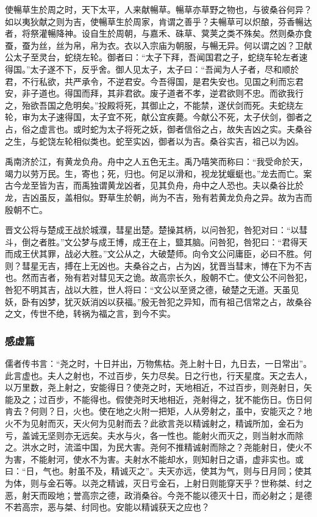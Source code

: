 \documentclass[]{article}
\begin{document}
使暢草生於周之时，天下太平，人来献暢草。暢草亦草野之物也，与彼桑谷何异？如以夷狄献之则为吉，使暢草生於周家，肯谓之善乎？夫暢草可以炽酿，芬香暢达者，将祭灌暢降神。设自生於周朝，与嘉禾、硃草、蓂荚之类不殊矣。然则桑亦食蚕，蚕为丝，丝为帛，帛为衣。衣以入宗庙为朝服，与暢无异。何以谓之凶？卫献公太子至灵台，蛇绕左轮。御者曰：``太子下拜，吾闻国君之子，蛇绕车轮左者速得国。''太子遂不下，反乎舍。御人见太子，太子曰：``吾闻为人子者，尽和顺於君，不行私欲，共严承令，不逆君安。今吾得国，是君失安也。见国之利而忘君安，非子道也。得国而拜，其非君欲。废子道者不孝，逆君欲则不忠。而欲我行之，殆欲吾国之危明矣。''投殿将死，其御止之，不能禁，遂伏剑而死。夫蛇绕左轮，审为太子速得国，太子宜不死，献公宜疾薨。今献公不死，太子伏剑，御者之占，俗之虚言也。或时蛇为太子将死之妖，御者信俗之占，故失吉凶之实。夫桑谷之生，与蛇饶左轮相似类也。蛇至实凶，御者以为吉。桑谷实吉，祖己以为凶。

禹南济於江，有黄龙负舟。舟中之人五色无主。禹乃嘻笑而称曰：``我受命於天，竭力以劳万民。生，寄也；死，归也。何足以滑和，视龙犹蝘蜓也。''龙去而亡。案古今龙至皆为吉，而禹独谓黄龙凶者，见其负舟，舟中之人恐也。夫以桑谷比於龙，吉凶虽反，盖相似。野草生於朝，尚为不吉，殆有若黄龙负舟之异。故为吉而殷朝不亡。

晋文公将与楚成王战於城濮，彗星出楚。楚操其柄，以问咎犯，咎犯对曰：``以彗斗，倒之者胜。''文公梦与成王博，成王在上，盬其脑。问咎犯，咎犯曰：``君得天而成王伏其罪，战必大胜。''文公从之，大破楚师。向令文公问庸臣，必曰不胜。何则？彗星无吉，搏在上无凶也。夫桑谷之占，占为凶，犹晋当彗末，博在下为不吉也。然而吉者，殆有若对彗见天之诡。故高宗长久，殷朝不亡。使文公不问咎犯，咎犯不明其吉，战以大胜，世人将曰：``文公以至贤之德，破楚之无道。天虽见妖，卧有凶梦，犹灭妖消凶以获福。''殷无咎犯之异知，而有祖己信常之占，故桑谷之文，传世不绝，转祸为福之言，到今不实。

\hypertarget{header-n190}{%
\subsubsection{感虚篇}\label{header-n190}}

儒者传书言：``尧之时，十日并出，万物焦枯。尧上射十日，九日去，一日常出''。此言虚也。夫人之射也，不过百步，矢力尽矣。日之行也，行天星度。天之去人，以万里数，尧上射之，安能得日？使尧之时，天地相近，不过百步，则尧射日，矢能及之；过百步，不能得也。假使尧时天地相近，尧射得之，犹不能伤日。伤日何肯去？何则？日，火也。使在地之火附一把矩，人从旁射之，虽中，安能灭之？地火不为见射而灭，天火何为见射而去？此欲言尧以精诚射之，精诚所加，金石为亏，盖诚无坚则亦无远矣。夫水与火，各一性也。能射火而灭之，则当射水而除之。洪水之时，流滥中国，为民大害。尧何不推精诚射而除之？尧能射日，使火不为害，不能射河，使水不为害。夫射水不能却水，则知射日之语，虚非实也。或曰：``日，气也。射虽不及，精诚灭之''。夫天亦远，使其为气，则与日月同；使其为体，则与金石等。以尧之精诚，灭日亏金石，上射日则能穿天乎？世称桀、纣之恶，射天而殴地；誉高宗之德，政消桑谷。今尧不能以德灭十日，而必射之；是德不若高宗，恶与桀、纣同也。安能以精诚获天之应也？
\end{document}
